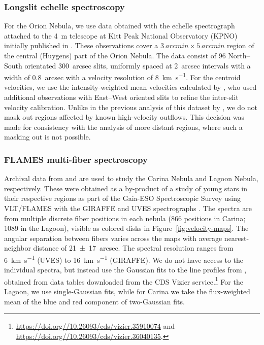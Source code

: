 \documentclass[fleqn,usenatbib, useAMS, a4paper]{mnras}
\begin{document}
\subsubsection{Longslit echelle spectroscopy}
\label{sec:longsl-echelle-spect}

For the Orion Nebula, we use data obtained with the echelle spectrograph attached to the \SI{4}{m} telescope at Kitt Peak National Observatory (KPNO) initially published in
\citet{Doi:2004a}.
These observations cover a \(\SI{3}{arcmin} \times \SI{5}{arcmin}\) region of the
central (Huygens) part of the Orion Nebula.
The data consist of 96 North--South orientated \SI{300}{arcsec} slits,
uniformly spaced at \SI{2}{arcsec} intervals with a width of \SI{0.8}{arcsec}
with a velocity resolution of \SI{8}{km.s^{-1}}. 
For the centroid velocities, we use the intensity-weighted
mean velocities calculated by \citet{Garcia-Diaz:2008a},
who used additional observations with East--West oriented slits
to refine the inter-slit velocity calibration. 
Unlike in the previous analysis of this dataset by \citet{arthur2016turbulence},
we do not mask out regions affected by known high-velocity outflows.
This decision was made for consistency with the analysis of more distant regions,
where such a masking out is not possible.

\subsubsection{FLAMES multi-fiber spectroscopy}
\label{sec:flames-multi-fiber}

Archival data from \citet{Damiani:2016a} and \citet{Damiani:2017b} are used
to study the Carina Nebula and Lagoon Nebula, respectively.
These were obtained as a by-product of a study of young stars in their respective regions
as part of the Gaia-ESO Spectroscopic Survey \citep{Gilmore:2012v, Randich:2013m}
using VLT/FLAMES with the GIRAFFE and UVES spectrographs \citep{2002Msngr.110....1P}.
The spectra are from multiple discrete fiber positions in each nebula
(866 positions in Carina; 1089 in the Lagoon),
visible as colored disks in Figure~\ref{fig:velocity-maps}.
The angular separation between fibers varies across the maps with
average nearest-neighbor distance of \SI{21 \pm 17}{arcsec}.
The spectral resolution ranges from  \SI{6}{km.s^{-1}} (UVES) to \SI{16}{km.s^{-1}} (GIRAFFE).
We do not have access to the individual spectra, but instead use the
Gaussian fits to the line profiles from \citep{Damiani:2016a, Damiani:2017b},
obtained from data tables downloaded from the CDS Vizier service.\footnote{%
  \url{https://doi.org//10.26093/cds/vizier.35910074} and
  \url{https://doi.org//10.26093/cds/vizier.36040135}.}
For the Lagoon, we use single-Gaussian fits, while for Carina we take the
flux-weighted mean of the blue and red component of two-Gaussian fits.
\end{document}
